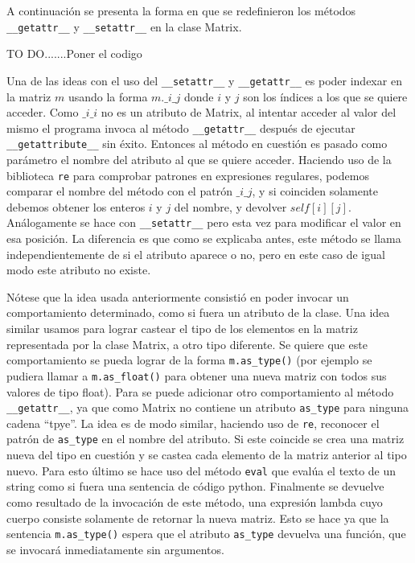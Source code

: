 \documentclass[10pt]{article}
\newcommand{\mgc}[1]{\texttt{\_\_#1\_\_}}
\newcommand{\csl}[1]{\texttt{#1}}
\newcommand{\todo}[1]{\color{red}TO DO.......#1\color{black}}
\begin{document}
A continuaci\'on se presenta la forma en que se redefinieron los m\'etodos \mgc{getattr} y \mgc{setattr} en la clase Matrix.

\todo{Poner el codigo}

Una de las ideas con el uso del \mgc{setattr} y \mgc{getattr} es poder indexar en la matriz $m$ usando la forma \csl{$m.\_i\_j$} donde $i$ y $j$ son los \'indices a los que se quiere acceder. Como \csl{$\_i\_i$} no es un atributo de Matrix, al intentar acceder al valor del mismo el programa invoca al m\'etodo \mgc{getattr} despu\'es de ejecutar \mgc{getattribute} sin \'exito. Entonces al m\'etodo en cuesti\'on es pasado como par\'ametro el nombre del atributo al que se quiere acceder. Haciendo uso de la biblioteca \csl{re} para comprobar patrones en expresiones regulares, podemos comparar el nombre del m\'etodo con el patr\'on \csl{$\_i\_j$}, y si coinciden solamente debemos obtener los enteros $i$ y $j$ del nombre, y devolver \csl{$self[i][j]$}. An\'alogamente se hace con \mgc{setattr} pero esta vez para modificar el valor en esa posici\'on. La diferencia es que como se explicaba antes, este m\'etodo se llama independientemente de si el atributo aparece o no, pero en este caso de igual modo este atributo no existe.

N\'otese que la idea usada anteriormente consisti\'o en poder invocar un comportamiento determinado, como si fuera un atributo de la clase. Una idea similar usamos para lograr castear el tipo de los elementos en la matriz representada por la clase Matrix, a otro tipo diferente. Se quiere que este comportamiento se pueda lograr de la forma \csl{m.as\_type()} (por ejemplo se pudiera llamar a \csl{m.as\_float()} para obtener una nueva matriz con todos sus valores de tipo float). Para se puede adicionar otro comportamiento al m\'etodo \mgc{getattr}, ya que como Matrix no contiene un atributo \csl{as\_type} para ninguna cadena ``tpye''. La idea es de modo similar, haciendo uso de \csl{re}, reconocer el patr\'on de \csl{as\_type} en el nombre del atributo. Si este coincide se crea una matriz nueva del tipo en cuesti\'on y se castea cada elemento de la matriz anterior al tipo nuevo. Para esto \'ultimo se hace uso del m\'etodo \csl{eval} que eval\'ua el texto de un string como si fuera una sentencia de c\'odigo python. Finalmente se devuelve como resultado de la invocaci\'on de este m\'etodo, una expresi\'on lambda cuyo cuerpo consiste solamente de retornar la nueva matriz. Esto se hace ya que la sentencia \csl{m.as\_type()} espera que el atributo \csl{as\_type} devuelva una funci\'on, que se invocar\'a inmediatamente sin argumentos.
\end{document}
